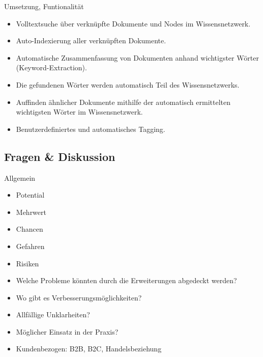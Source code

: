 Umsetzung, Funtionalität

\begin{itemize}
    \item Volltextsuche über verknüpfte Dokumente und Nodes im Wissensnetzwerk.
    \item Auto-Indexierung aller verknüpften Dokumente.
    \item Automatische Zusammenfassung von Dokumenten anhand wichtigster Wörter (Keyword-Extraction).
    \item Die gefundenen Wörter werden automatisch Teil des Wissensnetzwerks.
    \item Auffinden ähnlicher Dokumente mithilfe der automatisch ermittelten wichtigsten Wörter im Wissensnetzwerk.
    \item Benutzerdefiniertes und automatisches Tagging.
\end{itemize}

\subsection{Fragen \& Diskussion}

Allgemein

\begin{itemize}
    \item Potential
    \item Mehrwert
    \item Chancen
    \item Gefahren
    \item Risiken
\end{itemize}


\begin{itemize}
    \item Welche Probleme könnten durch die Erweiterungen abgedeckt werden?
    \item Wo gibt es Verbesserungsmöglichkeiten?
    \item Allfällige Unklarheiten?
    \item Möglicher Einsatz in der Praxis?
    \item Kundenbezogen: B2B, B2C, Handelsbeziehung
\end{itemize}